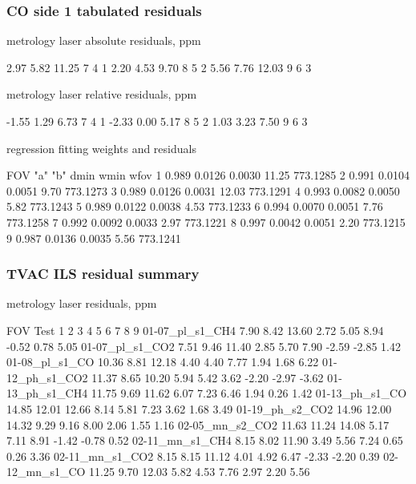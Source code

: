 \documentclass[9pt]{beamer}
\begin{document}
\begin{frame}[fragile]
\frametitle{CO side 1 tabulated residuals}

  metrology laser absolute residuals, ppm
\begin{semiverbatim}\scriptsize
      2.97     5.82    11.25         7   4   1
      2.20     4.53     9.70         8   5   2
      5.56     7.76    12.03         9   6   3
\end{semiverbatim}

  metrology laser relative residuals, ppm
\begin{semiverbatim}\scriptsize
     -1.55     1.29     6.73         7   4   1
     -2.33     0.00     5.17         8   5   2
      1.03     3.23     7.50         9   6   3
\end{semiverbatim}

  regression fitting weights and residuals
\begin{semiverbatim}\scriptsize
 FOV   "a"       "b"     dmin     wmin      wfov
  1   0.989    0.0126   0.0030    11.25   773.1285 
  2   0.991    0.0104   0.0051     9.70   773.1273 
  3   0.989    0.0126   0.0031    12.03   773.1291 
  4   0.993    0.0082   0.0050     5.82   773.1243 
  5   0.989    0.0122   0.0038     4.53   773.1233 
  6   0.994    0.0070   0.0051     7.76   773.1258 
  7   0.992    0.0092   0.0033     2.97   773.1221 
  8   0.997    0.0042   0.0051     2.20   773.1215 
  9   0.987    0.0136   0.0035     5.56   773.1241 
\end{semiverbatim}

\end{frame}
\begin{frame}[fragile]
\frametitle{TVAC ILS residual summary}

  metrology laser residuals, ppm
\begin{semiverbatim}\footnotesize
                                             FOV
     Test          1      2      3      4      5      6      7      8      9
01-07\_pl\_s1\_CH4   7.90   8.42  13.60   2.72   5.05   8.94  -0.52   0.78   5.05
01-07\_pl\_s1\_CO2   7.51   9.46  11.40   2.85   5.70   7.90  -2.59  -2.85   1.42
01-08\_pl\_s1\_CO   10.36   8.81  12.18   4.40   4.40   7.77   1.94   1.68   6.22
01-12\_ph\_s1\_CO2  11.37   8.65  10.20   5.94   5.42   3.62  -2.20  -2.97  -3.62
01-13\_ph\_s1\_CH4  11.75   9.69  11.62   6.07   7.23   6.46   1.94   0.26   1.42
01-13\_ph\_s1\_CO   14.85  12.01  12.66   8.14   5.81   7.23   3.62   1.68   3.49
01-19\_ph\_s2\_CO2  14.96  12.00  14.32   9.29   9.16   8.00   2.06   1.55   1.16
02-05\_mn\_s2\_CO2  11.63  11.24  14.08   5.17   7.11   8.91  -1.42  -0.78   0.52
02-11\_mn\_s1\_CH4   8.15   8.02  11.90   3.49   5.56   7.24   0.65   0.26   3.36
02-11\_mn\_s1\_CO2   8.15   8.15  11.12   4.01   4.92   6.47  -2.33  -2.20   0.39
02-12\_mn\_s1\_CO   11.25   9.70  12.03   5.82   4.53   7.76   2.97   2.20   5.56
\end{semiverbatim}

\end{frame}
\end{document}
